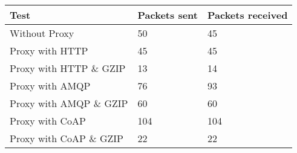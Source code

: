 \begin{tabular}{|l|l|l|}
\hline
\textbf{Test} & \textbf{Packets sent} & \textbf{Packets received} \\ \hline
Without Proxy                    &50         & 45        \\ \hline 
Proxy with HTTP                  &45         & 45        \\ \hline 
Proxy with HTTP \& GZIP          &13         & 14        \\ \hline 
Proxy with AMQP                  &76         & 93        \\ \hline 
Proxy with AMQP \& GZIP          &60         & 60        \\ \hline 
Proxy with CoAP                  &104        & 104       \\ \hline 
Proxy with CoAP \& GZIP          &22         & 22        \\ \hline 
\end{tabular}